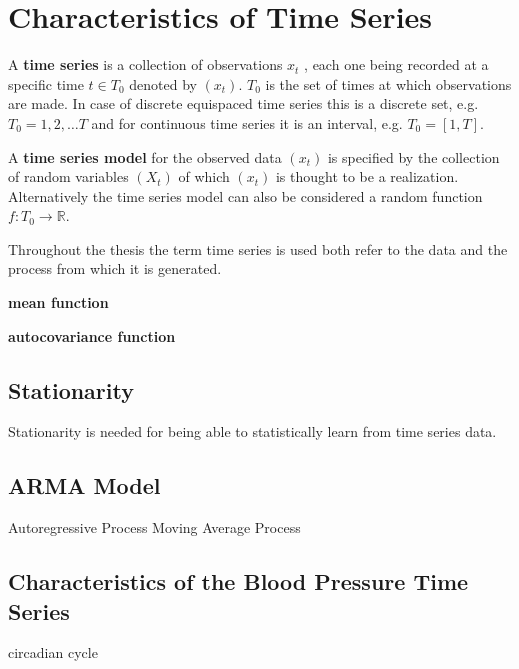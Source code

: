 

\chapter{Characteristics of Time Series}

A \textbf{time series} is a collection of observations $x_t$ , each one being recorded at a specific time $t \in T_0$ denoted by
$(x_t)$.
$T_0$ is the set of times at which observations are made.
In case of discrete equispaced time series this is a discrete set, e.g. $T_0 = {1, 2, \dots T}$
and for continuous time series it is an interval, e.g. $T_0 = [1, T]$.

A \textbf{time series model} for the observed data $(x_t)$ is specified by the collection of random variables
$(X_t)$ of which $(x_t)$ is thought to be a realization.
Alternatively the time series model can also be considered a random function $f: T_0 \to \mathbb{R}$.


Throughout the thesis the term time series is used both refer to the data and the process from which it is generated.


\textbf{mean function}

\textbf{autocovariance function}


\section{Stationarity}
Stationarity is needed for being able to statistically learn from time series data.



\section{ARMA Model}

Autoregressive Process
Moving Average Process



\section{Characteristics of the Blood Pressure Time Series}

circadian cycle






